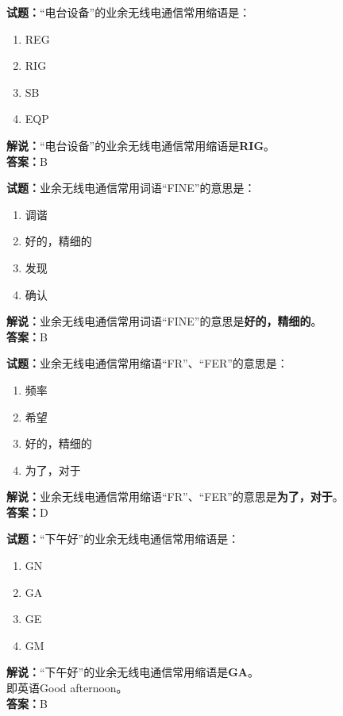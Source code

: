 \documentclass{ctexbook}
\begin{document}
\bigskip


\noindent\textbf{试题：}“电台设备”的业余无线电通信常用缩语是：
\begin{enumerate}[leftmargin=3em]
\item REG
\item RIG
\item SB
\item EQP
\end{enumerate}
\noindent\textbf{解说：}“电台设备”的业余无线电通信常用缩语是\textbf{RIG}。\\\noindent\textbf{答案：}B

\bigskip


\noindent\textbf{试题：}业余无线电通信常用词语“FINE”的意思是：
\begin{enumerate}[leftmargin=3em]
\item 调谐
\item 好的，精细的
\item 发现
\item 确认
\end{enumerate}
\noindent\textbf{解说：}业余无线电通信常用词语“FINE”的意思是\textbf{好的，精细的}。\\\noindent\textbf{答案：}B
\bigskip


\noindent\textbf{试题：}业余无线电通信常用缩语“FR”、“FER”的意思是：
\begin{enumerate}[leftmargin=3em]
\item 频率
\item 希望
\item 好的，精细的
\item 为了，对于
\end{enumerate}
\noindent\textbf{解说：}业余无线电通信常用缩语“FR”、“FER”的意思是\textbf{为了，对于}。\\\noindent\textbf{答案：}D


\bigskip


\noindent\textbf{试题：}“下午好”的业余无线电通信常用缩语是：
\begin{enumerate}[leftmargin=3em]
\item GN
\item GA
\item GE
\item GM
\end{enumerate}
\noindent\textbf{解说：}“下午好”的业余无线电通信常用缩语是\textbf{GA}。\\即英语Good afternoon。\\\noindent\textbf{答案：}B

\bigskip
\end{document}
